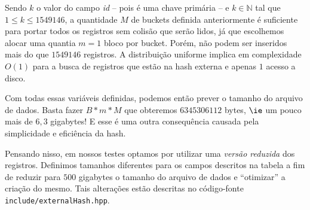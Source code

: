 Sendo $k$ o valor do campo \emph{id} -- pois é uma chave primária -- e $k \in \mathbb{N}$ tal que $1 \leq k \leq 1549146$, a quantidade $M$ de buckets definida anteriormente é suficiente para portar todos os registros sem colisão que serão lidos, já que escolhemos alocar uma quantia $m = 1$ bloco por bucket. Porém, não podem ser inseridos mais do que $1549146$ registros. A distribuição uniforme implica em complexidade $O(1)$ para a busca de registros que estão na hash externa e apenas $1$ acesso a disco.

Com todas essas variáveis definidas, podemos então prever o tamanho do arquivo de dados.
Basta fazer $B * m * M$ que obteremos $6345306112$ bytes, $\ie$ um pouco mais de $6,3$ gigabytes!
E esse é uma outra consequência causada pela simplicidade e eficiência da hash.

Pensando nisso, em nossos testes optamos por utilizar uma \emph{versão reduzida} dos registros. Definimos tamanhos diferentes para os campos descritos na tabela  a fim de reduzir para $500$ gigabytes o tamanho do arquivo de dados e ``otimizar'' a criação do mesmo.
Tais alterações estão descritas no código-fonte \texttt{include/externalHash.hpp}.